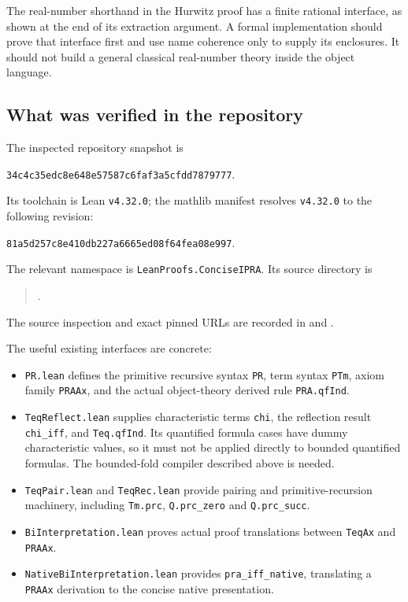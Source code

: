 The real-number shorthand in the Hurwitz proof has a finite rational
interface, as shown at the end of its extraction argument.  A formal
implementation should prove that interface first and use name coherence
only to supply its enclosures.  It should not build a general classical
real-number theory inside the object language.

\subsection{What was verified in the repository}

The inspected repository snapshot is
\begin{center}
\texttt{34c4c35edc8e648e57587c6faf3a5cfdd7879777}.
\end{center}
Its toolchain is Lean \texttt{v4.32.0}; the mathlib manifest resolves
\texttt{v4.32.0} to the following revision:
\begin{center}
\texttt{81a5d257c8e410db227a6665ed08f64fea08e997}.
\end{center}
The relevant namespace is \texttt{LeanProofs.ConciseIPRA}.  Its source
directory is
\begin{quote}\small
{}.
\end{quote}
The source inspection and exact pinned URLs are recorded in
 and .

The useful existing interfaces are concrete:\begin{itemize}
\item \texttt{PR.lean} defines the primitive recursive syntax
\texttt{PR}, term syntax \texttt{PTm}, axiom family \texttt{PRAAx}, and
the actual object-theory derived rule \texttt{PRA.qfInd}.
\item \texttt{TeqReflect.lean} supplies characteristic terms
\texttt{chi}, the reflection result \texttt{chi\_iff}, and
\texttt{Teq.qfInd}.  Its quantified formula cases have dummy
characteristic values, so it must not be applied directly to bounded
quantified formulas.  The bounded-fold compiler described above is needed.
\item \texttt{TeqPair.lean} and \texttt{TeqRec.lean} provide pairing and
primitive-recursion machinery, including \texttt{Tm.prc},
\texttt{Q.prc\_zero} and \texttt{Q.prc\_succ}.
\item \texttt{BiInterpretation.lean} proves actual proof translations
between \texttt{TeqAx} and \texttt{PRAAx}.
\item \texttt{NativeBiInterpretation.lean} provides
\texttt{pra\_iff\_native}, translating a \texttt{PRAAx} derivation to
the concise native presentation.
\end{itemize}

